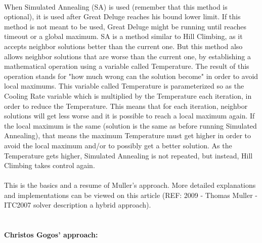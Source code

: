 \\
When Simulated Annealing (SA) is used (remember that this method is optional), it is used after Great Deluge reaches his bound lower limit. If this method is not meant to be used, Great Deluge might be running until reaches timeout or a global maximum. SA is a method similar to Hill Climbing, as it accepts neighbor solutions better than the current one. But this method also allows neighbor solutions that are worse than the current one, by establishing a mathematical operation using a variable called Temperature. The result of this operation stands for "how much wrong can the solution become" in order to avoid local maximums. This variable called Temperature is parameterized so as the Cooling Rate variable which is multiplied by the Temperature each iteration, in order to reduce the Temperature. This means that for each iteration, neighbor solutions will get less worse and it is possible to reach a local maximum again. If the local maximum is the same (solution is the same as before running Simulated Annealing), that means the maximum Temperature must get higher in order to avoid the local maximum and/or to possibly get a better solution. As the Temperature gets higher, Simulated Annealing is not repeated, but instead, Hill Climbing takes control again.\\
\\
This is the basics and a resume of Muller's approach. More detailed explanations and implementations can be viewed on this article (REF: 2009 - Thomas Muller - ITC2007 solver description a hybrid approach).\\
\\
\paragraph{\textbf{Christos Gogos' approach:}}


